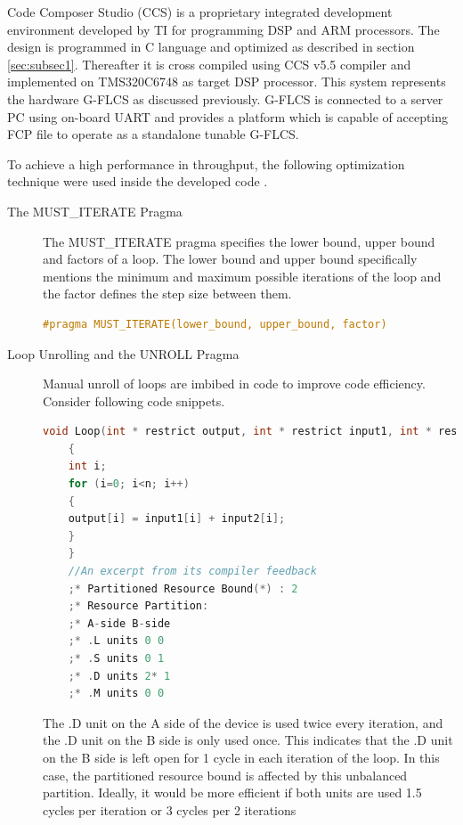 Code Composer Studio (CCS) is a proprietary integrated development environment developed by TI for programming DSP and ARM processors. The design is programmed in C language and optimized as described in section \ref{sec:subsec1}. Thereafter it is cross compiled using CCS v5.5 compiler and implemented on TMS320C6748 as target DSP processor. This system represents the hardware G\hyp{}FLCS as discussed previously. G\hyp{}FLCS is connected to a server PC using on\hyp{}board UART and provides a platform which is capable of accepting FCP file to operate as a standalone tunable G\hyp{}FLCS.

To achieve a high performance in throughput, the following optimization technique were used inside the developed code \cite{TexasInstruments2013}.
\begin{description}
	\item[The MUST\_ITERATE Pragma] The MUST\_ITERATE pragma specifies the lower bound, upper bound and factors of a loop. The lower bound and upper bound specifically mentions the minimum and maximum possible iterations of the loop and the factor defines the step size between them.
	\begin{lstlisting}[language=C,caption={MUSTITERATE Pragma},label=CS:constraints]
		#pragma MUST_ITERATE(lower_bound, upper_bound, factor)
	\end{lstlisting}
	\item[Loop Unrolling and the UNROLL Pragma] Manual unroll of loops are imbibed in code to improve code efficiency. Consider following code snippets.
	\begin{lstlisting}[language=C,caption={A Loop Code With Unbalanced Resource Partition},label=CS:constraints]	
	void Loop(int * restrict output, int * restrict input1, int * restrict input2, int n)
	{
	int i;
	for (i=0; i<n; i++)
	{
	output[i] = input1[i] + input2[i];
	}
	}
	//An excerpt from its compiler feedback
	;* Partitioned Resource Bound(*) : 2
	;* Resource Partition:
	;* A-side B-side
	;* .L units 0 0
	;* .S units 0 1
	;* .D units 2* 1
	;* .M units 0 0
	\end{lstlisting}
	The .D unit on the A side of the device is used twice every iteration, and the .D unit on the B side is only used once. This indicates that the .D unit on the B side is left open for 1 cycle in each iteration of the loop. In this case, the partitioned resource bound is affected by this unbalanced partition. Ideally, it would be more efficient if both units are used 1.5 cycles per iteration or 3 cycles per 2 iterations
	\begin{lstlisting}[language=C,caption={Manually Unrolled Loop},label=CS:constraints]

\end{lstlisting}
\end{description}
